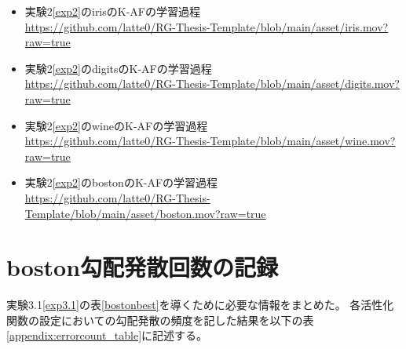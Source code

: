 \begin{itemize}
  \item 実験2\ref{exp2}のirisのK-AFの学習過程 \\ \href{https://github.com/latte0/RG-Thesis-Template/blob/main/asset/iris.mov?raw=true}{https://github.com/latte0/RG-Thesis-Template/blob/main/asset/iris.mov?raw=true}
  \item 実験2\ref{exp2}のdigitsのK-AFの学習過程 \\ \href{https://github.com/latte0/RG-Thesis-Template/blob/main/asset/digits.mov?raw=true}{https://github.com/latte0/RG-Thesis-Template/blob/main/asset/digits.mov?raw=true}
  \item 実験2\ref{exp2}のwineのK-AFの学習過程 \\ \href{https://github.com/latte0/RG-Thesis-Template/blob/main/asset/wine.mov?raw=true}{https://github.com/latte0/RG-Thesis-Template/blob/main/asset/wine.mov?raw=true}
  \item 実験2\ref{exp2}のbostonのK-AFの学習過程 \\ \href{https://github.com/latte0/RG-Thesis-Template/blob/main/asset/boston.mov?raw=true}{https://github.com/latte0/RG-Thesis-Template/blob/main/asset/boston.mov?raw=true}
\end{itemize}



\chapter{boston勾配発散回数の記録}
\label{appendix:error}

実験3.1\ref{exp3.1}の表\ref{bostonbest}を導くために必要な情報をまとめた。
各活性化関数の設定においての勾配発散の頻度を記した結果を以下の表\ref{appendix:errorcount_table}に記述する。

